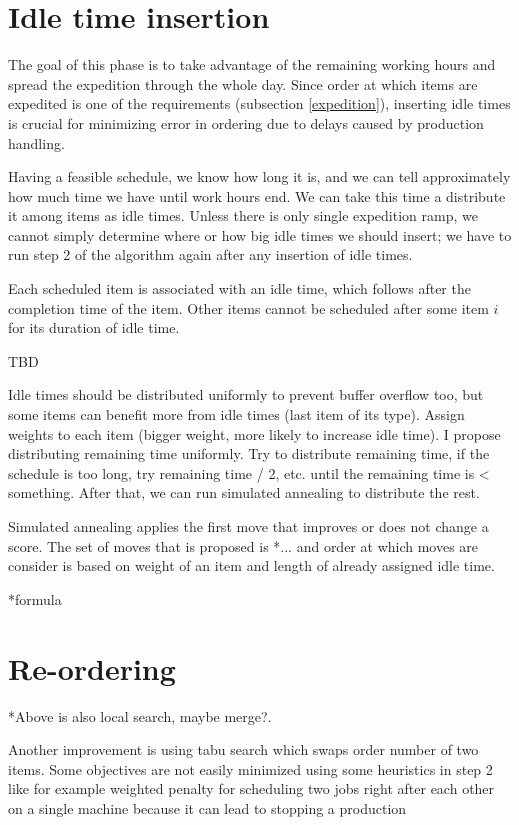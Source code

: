\documentclass{ctuthesis}
\begin{document}
\section{Idle time insertion}

The goal of this phase is to take advantage of the remaining working hours and spread the expedition through the whole day. Since order at which items are expedited is one of the requirements (subsection \ref{expedition}), inserting idle times is crucial for minimizing error in ordering due to delays caused by production handling.

Having a feasible schedule, we know how long it is, and we can tell approximately how much time we have until work hours end. We can take this time a distribute it among items as idle times. Unless there is only single expedition ramp, we cannot simply determine where or how big idle times we should insert; we have to run step 2 of the algorithm again after any insertion of idle times.

Each scheduled item is associated with an idle time, which follows after the completion time of the item. Other items cannot be scheduled after some item $i$ for its duration of idle time.

TBD

Idle times should be distributed uniformly to prevent buffer overflow too, but some items can benefit more from idle times (last item of its type).  Assign weights to each item (bigger weight, more likely to increase idle time). I propose distributing remaining time uniformly. Try to distribute remaining time, if the schedule is too long, try remaining time / 2, etc. until the remaining time is < something. After that, we can run simulated annealing to distribute the rest.

Simulated annealing applies the first move that improves or does not change a score. The set of moves that is proposed is *... and order at which moves are consider is based on weight of an item and length of already assigned idle time. 

*formula

\section{Re-ordering}
*Above is also local search, maybe merge?.

Another improvement is using tabu search which swaps order number of two items. Some objectives are not easily minimized using some heuristics in step 2 like for example weighted penalty for scheduling two jobs right after each other on a single machine because it can lead to stopping a production
\end{document}
